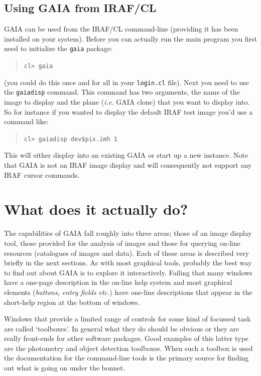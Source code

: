 \documentclass[twoside,11pt]{article}
\newcommand{\xlabel}[1]{}
\renewcommand{\_}{\texttt{\symbol{95}}}
\newcommand{\mytt}[1]{{\texttt{#1}}}
\begin{document}
\subsection{\xlabel{using_gaia_from_irafcl}Using GAIA from IRAF/CL}

GAIA can be used from the IRAF/CL command-line (providing it has been
installed on your system). Before you can actually run the main program
you first need to initialize the \mytt{gaia} package:
\begin{quote}
\mytt{cl> gaia}
\end{quote}
(you could do this once and for all in your \mytt{login.cl}
file). Next you need to use the \mytt{gaiadisp} command. This command
has two arguments, the name of the image to display and the plane
(\textit{i.e.} GAIA clone) that you want to display into. So for instance
if you wanted to display the default IRAF test image you'd use a
command like:
\begin{quote}
\mytt{cl> gaiadisp dev\$pix.imh 1}
\end{quote}
This will either display into an existing GAIA or start up a new
instance. Note that GAIA is not an IRAF image display and will
consequently not support any IRAF cursor commands.

\section{\xlabel{what_does_it_actually_do}What does it actually do?}

The capabilities of GAIA fall roughly into three areas; those of an
image display tool, those provided for the analysis of images and
those for querying on-line resources (catalogues of images and
data). Each of these areas is described very briefly in the next
sections. As with most graphical tools, probably the best way to find
out about GAIA is to explore it interactively. Failing that many
windows have a one-page description in the on-line help system and
most graphical elements (\textit{buttons, entry fields etc.}) have
one-line descriptions that appear in the short-help region at the
bottom of windows.

Windows that provide a limited range of controls for some kind of
focussed task are called `toolboxes'. In general what they do should
be obvious or they are really front-ends for other software
packages. Good examples of this latter type are the photometry and
object detection toolboxes. When such a toolbox is used the
documentation for the command-line tools is the primary source for
finding out what is going on under the bonnet.
\end{document}
